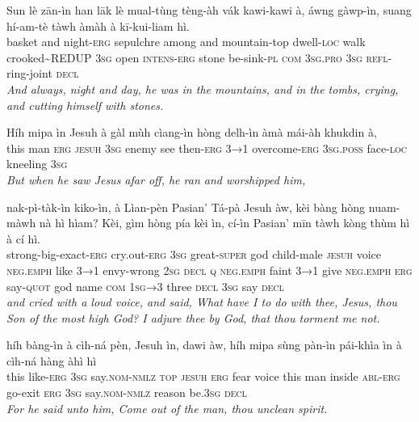 \documentclass[11pt,a4paper]{article}
\begin{document}
\begin{exe}
\gll Sun lè zān-ìn han lāk lè mual-tùng tèng-àh vák kawi-kawi à, áwng gàwp-ìn, suang hí-am-tè tàwh àmàh à kī-kui-liam hì. \\
     basket and night-\textsc{erg} sepulchre among and mountain-top dwell-\textsc{loc} walk crooked\textasciitilde{}REDUP \textsc{3sg} open \textsc{intens}-\textsc{erg} stone be-sink-\textsc{pl} \textsc{com} \textsc{3sg}.\textsc{pro} \textsc{3sg} \textsc{refl}-ring-joint \textsc{decl} \\
\glt \textcolor{kjvcolor}{\textit{And always, night and day, he was in the mountains, and in the tombs, crying, and cutting himself with stones.}}

\gll Híh mipa ìn Jesuh à gàl mùh cìang-ìn hòng delh-ìn àmà mái-àh khukdin à, \\
     this man \textsc{erg} \textsc{jesuh} \textsc{3sg} enemy see then-\textsc{erg} \textsc{3→1} overcome-\textsc{erg} \textsc{3sg}.\textsc{poss} face-\textsc{loc} kneeling \textsc{3sg} \\
\glt \textcolor{kjvcolor}{\textit{But when he saw Jesus afar off, he ran and worshipped him,}}

\gll nak-pì-tàk-ìn kiko-ìn, à Lìan-pèn Pasian' Tá-pà Jesuh àw, kèi bàng hòng nuam-màwh nà hì hìam? Kèi, gìm hòng pía kèi ìn, cí-ìn Pasian' mīn tàwh kòng thùm hì à cí hì. \\
     strong-big-exact-\textsc{erg} cry.out-\textsc{erg} \textsc{3sg} great-\textsc{super} god child-male \textsc{jesuh} voice \textsc{neg}.\textsc{emph} like \textsc{3→1} envy-wrong \textsc{2sg} \textsc{decl} \textsc{q} \textsc{neg}.\textsc{emph} faint \textsc{3→1} give \textsc{neg}.\textsc{emph} \textsc{erg} say-\textsc{quot} god name \textsc{com} \textsc{1sg→3} three \textsc{decl} \textsc{3sg} say \textsc{decl} \\
\glt \textcolor{kjvcolor}{\textit{and cried with a loud voice, and said, What have I to do with thee, Jesus, thou Son of the most high God? I adjure thee by God, that thou torment me not.}}

\gll híh bàng-ìn à cìh-ná pèn, Jesuh ìn, dawi àw, híh mipa sùng pàn-ìn pái-khìa ìn à cìh-ná hàng àhì hì \\
     this like-\textsc{erg} \textsc{3sg} say.\textsc{nom}-\textsc{nmlz} \textsc{top} \textsc{jesuh} \textsc{erg} fear voice this man inside \textsc{abl}-\textsc{erg} go-exit \textsc{erg} \textsc{3sg} say.\textsc{nom}-\textsc{nmlz} reason be.\textsc{3sg} \textsc{decl} \\
\glt \textcolor{kjvcolor}{\textit{For he said unto him, Come out of the man, thou unclean spirit.}}


\end{exe}
\end{document}

